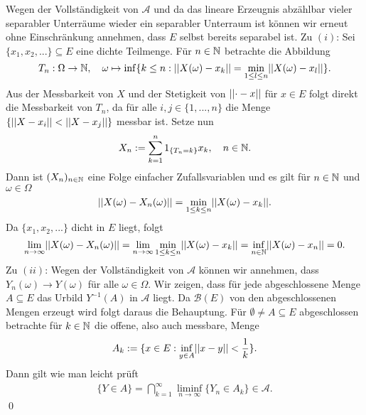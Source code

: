 \begin{proof*}
    Wegen der Vollständigkeit von $\mathcal{A}$ und da das lineare Erzeugnis abzählbar vieler separabler Unterräume wieder ein separabler Unterraum ist können wir erneut ohne Einschränkung annehmen, dass $E$ selbst bereits separabel ist.
    \newline 
    Zu $(i)$:
    Sei $\{x_1,x_2,... \} \subseteq E$ eine dichte Teilmenge. Für $n \in \mathbb{N}$ betrachte die Abbildung
    $$
        T_n: \Omega \to \mathbb{N}, \quad \omega \mapsto \inf\{k \leq n: \lvert\lvert X(\omega)-x_k \rvert\rvert = \min_{1\leq l \leq n}\lvert\lvert X(\omega)-x_l \rvert\rvert\}.
    $$ 
    Aus der Messbarkeit von $X$ und der Stetigkeit von $\lvert\lvert \cdot - x \rvert\rvert$ für $x \in E$ folgt direkt die Messbarkeit von $T_n$,
    da für alle $i,j \in \{1,...,n\}$ die Menge $\{\lvert\lvert X - x_i \rvert\rvert < \lvert\lvert X - x_j \rvert\rvert\}$ messbar ist. Setze nun
    $$
        X_n := \sum_{k=1}^n 1_{\{T_n = k\}}x_k, \quad n \in \mathbb{N}.
    $$
    Dann ist $(X_n)_{n \in \mathbb{N}}$ eine Folge einfacher Zufallsvariablen und es gilt für $n \in \mathbb{N}$ und $\omega \in \Omega$
    $$
        \lvert\lvert X(\omega)-X_n(\omega) \rvert\rvert = \min_{1\leq k \leq n}\lvert\lvert X(\omega)-x_k \rvert\rvert.
    $$
    Da $\{x_1,x_2,...\}$ dicht in $E$ liegt, folgt 
    $$
        \lim_{n \to \infty}\lvert\lvert X(\omega) - X_n(\omega) \rvert\rvert = \lim_{n \to \infty}\min_{1\leq k \leq n}\lvert\lvert X(\omega)- x_k \rvert\rvert = \inf_{n \in \mathbb{N}} \lvert\lvert X(\omega)- x_n \rvert\rvert = 0. 
    $$
    Zu $(ii)$: Wegen der Vollständigkeit von $\mathcal{A}$ können wir annehmen, dass $Y_n(\omega) \to Y(\omega)$ für alle $\omega \in \Omega$. 
    Wir zeigen, dass für jede abgeschlossene Menge $A \subseteq E$ das Urbild $Y^{-1}(A)$ in $\mathcal{A}$ liegt. 
    Da $\mathcal{B}(E)$ von den abgeschlossenen Mengen erzeugt wird folgt daraus die Behauptung. 
    Für $\emptyset \neq A \subseteq E$ abgeschlossen betrachte für $k \in \mathbb{N}$ die offene, also auch messbare, Menge 
    $$
        A_k := \{x \in E: \inf_{y\in A}\lvert\lvert x-y \rvert\rvert < \frac{1}{k}\}.
    $$
    Dann gilt wie man leicht prüft
    \begin{align*}
        \{Y \in A\} = \bigcap_{k=1}^{\infty}\liminf_{n \to \infty}\{Y_n \in A_k\} \in \mathcal{A}.
    \end{align*}     
    \qed 
\end{proof*}


